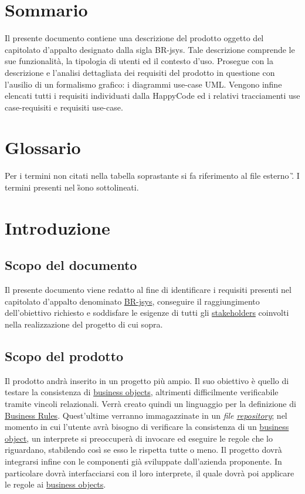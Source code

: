 \tableofcontents
\chapter*{Sommario}
Il presente documento contiene una descrizione del prodotto oggetto del capitolato d'appalto designato dalla sigla BR-jsys. Tale descrizione
comprende le sue funzionalit\`a, la tipologia di utenti ed il contesto d'uso. Prosegue con la descrizione e l'analisi dettagliata dei requisiti del prodotto in questione con l'ausilio di un formalismo grafico: i diagrammi use-case UML. Vengono infine elencati tutti i requisiti individuati dalla
HappyCode ed i relativi tracciamenti use case-requisiti e requisiti use-case.

\chapter*{Glossario}
Per i termini non citati nella tabella soprastante si fa riferimento al file esterno \G. I termini presenti nel \G sono sottolineati.

\chapter{Introduzione}
\section{Scopo del documento}
Il presente documento viene redatto al fine di identificare i requisiti presenti nel capitolato d'appalto denominato \underline{BR-jsys}, conseguire il raggiungimento dell'obiettivo richiesto e soddisfare le esigenze di tutti gli \underline{stakeholders} coinvolti nella realizzazione del progetto di cui sopra.
\section{Scopo del prodotto}
Il prodotto andr\`a inserito in un progetto pi\`u ampio. Il suo obiettivo \`e quello di testare la consistenza di \underline{business objects}, altrimenti difficilmente verificabile tramite vincoli relazionali.
Verr\`a creato quindi un linguaggio per la definizione di \underline{Business Rules}. Quest'ultime verranno immagazzinate in un \textit{file \underline{repository}}; nel momento in cui l'utente avr\`a bisogno di verificare la consistenza di un \underline{business object}, un interprete si preoccuper\`a di invocare ed eseguire le regole che lo riguardano, stabilendo cos\`i se esso le rispetta tutte o meno.
Il progetto dovr\`a integrarsi infine con le componenti gi\`a sviluppate dall'azienda proponente. In particolare dovr\`a interfacciarsi con il loro interprete, il quale dovr\`a poi applicare le regole ai \underline{business objects}.
